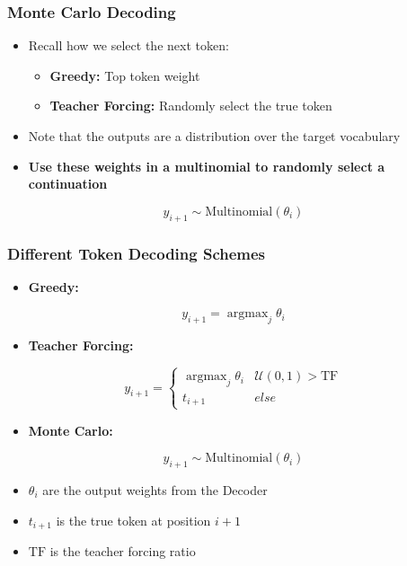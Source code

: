 \documentclass[usenames,dvipsnames]{beamer}
\DeclareMathOperator*{\argmax}{argmax}
\begin{document}
\begin{frame}
  \frametitle{Monte Carlo Decoding}
  \begin{itemize}
    \item Recall how we select the next token:
    \begin{itemize}
      \item \textbf{Greedy:} Top token weight
      \item \textbf{Teacher Forcing:} Randomly select the true token
    \end{itemize}
    \item Note that the outputs are a distribution over the target vocabulary
    \item \textbf{Use these weights in a multinomial to randomly select a continuation}
  \end{itemize}
  \begin{equation*}
      y_{i+1} \sim \text{Multinomial}\left( \theta_i \right)
  \end{equation*}
\end{frame}



\begin{frame}
  \frametitle{Different Token Decoding Schemes}
  \begin{itemize}
    \item \textbf{Greedy:}
  \end{itemize}
  \begin{equation*}
    y_{i+1} = \argmax_j \theta_i
  \end{equation*}
  \begin{itemize}
    \item \textbf{Teacher Forcing:}
  \end{itemize}
  \begin{equation*}
    y_{i+1} = \begin{cases}
      \argmax_{j} \theta_i  & \mathcal{U}(0, 1) > \text{TF} \\
      t_{i+1} & else
    \end{cases}
  \end{equation*}
  \begin{itemize}
    \item \textbf{Monte Carlo:}
  \end{itemize}
  \begin{equation*}
    y_{i+1} \sim \text{Multinomial}\left( \theta_i \right)
  \end{equation*}
  \begin{itemize}
    \item $\theta_i$ are the output weights from the Decoder
    \item $t_{i+1}$ is the true token at position $i + 1$
    \item $\text{TF}$ is the teacher forcing ratio
  \end{itemize}
\end{frame}
\end{document}

